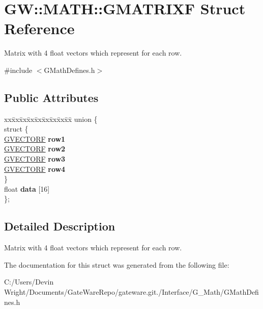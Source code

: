 \hypertarget{struct_g_w_1_1_m_a_t_h_1_1_g_m_a_t_r_i_x_f}{}\section{GW\+:\+:M\+A\+TH\+:\+:G\+M\+A\+T\+R\+I\+XF Struct Reference}
\label{struct_g_w_1_1_m_a_t_h_1_1_g_m_a_t_r_i_x_f}


Matrix with 4 float vectors which represent for each row.  




{\ttfamily \#include $<$G\+Math\+Defines.\+h$>$}

\subsection*{Public Attributes}
\begin{DoxyCompactItemize}
\item 
\mbox{\label{struct_g_w_1_1_m_a_t_h_1_1_g_m_a_t_r_i_x_f_a11be480da796165318d456b16f72d5e1}} 
\begin{tabbing}
xx\=xx\=xx\=xx\=xx\=xx\=xx\=xx\=xx\=\kill
union \{\\
\mbox{\label{union_g_w_1_1_m_a_t_h_1_1_g_m_a_t_r_i_x_f_1_1_0D12_a9d73f51400dc55a0d7b56e032f731459}} 
\>struct \{\\
\>\>\mbox{\hyperlink{struct_g_w_1_1_m_a_t_h_1_1_g_v_e_c_t_o_r_f}{GVECTORF}} {\bfseries row1}\\
\>\>\mbox{\hyperlink{struct_g_w_1_1_m_a_t_h_1_1_g_v_e_c_t_o_r_f}{GVECTORF}} {\bfseries row2}\\
\>\>\mbox{\hyperlink{struct_g_w_1_1_m_a_t_h_1_1_g_v_e_c_t_o_r_f}{GVECTORF}} {\bfseries row3}\\
\>\>\mbox{\hyperlink{struct_g_w_1_1_m_a_t_h_1_1_g_v_e_c_t_o_r_f}{GVECTORF}} {\bfseries row4}\\
\>\} \\
\>float {\bfseries data} \mbox{[}16\mbox{]}\\
\}; \\

\end{tabbing}\end{DoxyCompactItemize}


\subsection{Detailed Description}
Matrix with 4 float vectors which represent for each row. 

The documentation for this struct was generated from the following file\+:\begin{DoxyCompactItemize}
\item 
C\+:/\+Users/\+Devin Wright/\+Documents/\+Gate\+Ware\+Repo/gateware.\+git./\+Interface/\+G\+\_\+\+Math/G\+Math\+Defines.\+h\end{DoxyCompactItemize}
